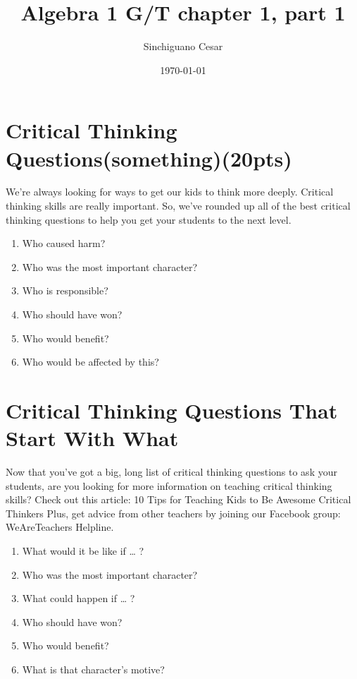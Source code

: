 \documentclass[10]{article}
\begin{document}
\title{Algebra 1 G/T chapter 1, part 1}
\author{Sinchiguano Cesar}
\date{\today}
\maketitle



\section{Critical Thinking Questions(something)(20pts)}
We’re always looking for ways to get our kids to think more deeply. Critical thinking skills are really important. So, we’ve rounded up all of the best critical thinking questions to help you get your students to the next level. 

\begin{enumerate}

    \item Who caused harm?
    \item Who was the most important character?
    \item Who is responsible?
    \item Who should have won?
    \item Who would benefit?
    \item Who would be affected by this?

\end{enumerate}

\section{Critical Thinking Questions That Start With What}
Now that you’ve got a big, long list of critical thinking questions to ask your students, are you looking for more information on teaching critical thinking skills? Check out this article: 10 Tips for Teaching Kids to Be Awesome Critical Thinkers Plus, get advice from other teachers by joining our Facebook group: WeAreTeachers Helpline. 

\begin{enumerate}

    \item  What would it be like if … ?
    \item Who was the most important character?
    \item What could happen if … ?
    \item Who should have won?
    \item Who would benefit?
    \item What is that character’s motive? 

\end{enumerate}
\end{document}
